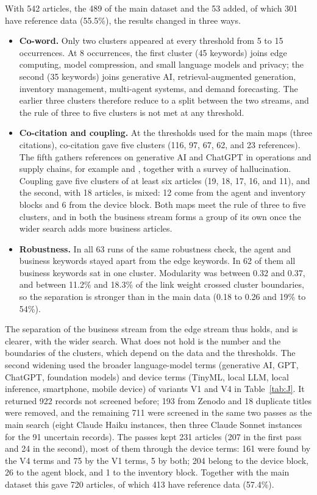 With 542 articles, the 489 of the main dataset and the 53 added, of which 301 have reference data (55.5\%), the results changed in three ways.
\begin{itemize}
  \item \textbf{Co-word.} Only two clusters appeared at every threshold from 5 to 15 occurrences. At 8 occurrences, the first cluster (45 keywords) joins edge computing, model compression, and small language models and privacy; the second (35 keywords) joins generative AI, retrieval-augmented generation, inventory management, multi-agent systems, and demand forecasting. The earlier three clusters therefore reduce to a split between the two streams, and the rule of three to five clusters is not met at any threshold.
  \item \textbf{Co-citation and coupling.} At the thresholds used for the main maps (three citations), co-citation gave five clusters (116, 97, 67, 62, and 23 references). The fifth gathers references on generative AI and ChatGPT in operations and supply chains, for example \textcite{wamba2023} and \textcite{jackson2024}, together with a survey of hallucination. Coupling gave five clusters of at least six articles (19, 18, 17, 16, and 11), and the second, with 18 articles, is mixed: 12 come from the agent and inventory blocks and 6 from the device block. Both maps meet the rule of three to five clusters, and in both the business stream forms a group of its own once the wider search adds more business articles.
  \item \textbf{Robustness.} In all 63 runs of the same robustness check, the agent and business keywords stayed apart from the edge keywords. In 62 of them all business keywords sat in one cluster. Modularity was between 0.32 and 0.37, and between 11.2\% and 18.3\% of the link weight crossed cluster boundaries, so the separation is stronger than in the main data (0.18 to 0.26 and 19\% to 54\%).
\end{itemize}
The separation of the business stream from the edge stream thus holds, and is clearer, with the wider search. What does not hold is the number and the boundaries of the clusters, which depend on the data and the thresholds. The second widening used the broader language-model terms (generative AI, GPT, ChatGPT, foundation models) and device terms (TinyML, local LLM, local inference, smartphone, mobile device) of variants V1 and V4 in Table~\ref{tab:J}. It returned 922 records not screened before; 193 from Zenodo and 18 duplicate titles were removed, and the remaining 711 were screened in the same two passes as the main search (eight Claude Haiku instances, then three Claude Sonnet instances for the 91 uncertain records). The passes kept 231 articles (207 in the first pass and 24 in the second), most of them through the device terms: 161 were found by the V4 terms and 75 by the V1 terms, 5 by both; 204 belong to the device block, 26 to the agent block, and 1 to the inventory block. Together with the main dataset this gave 720 articles, of which 413 have reference data (57.4\%).
